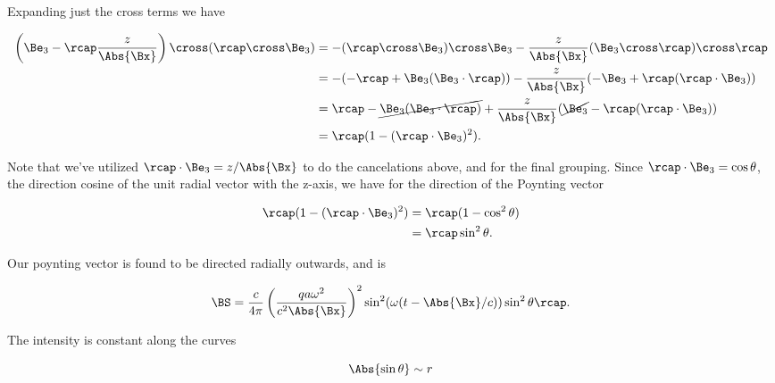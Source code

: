 Expanding just the cross terms we have

\begin{align*}
\left( \Be_3 - \rcap \frac{z}{\Abs{\Bx}} \right) \cross (\rcap \cross \Be_3)
&=
-(\rcap \cross \Be_3) \cross \Be_3 - \frac{z}{\Abs{\Bx}} (\Be_3 \cross \rcap) \cross \rcap \\
&=
-(-\rcap + \Be_3(\Be_3 \cdot \rcap) ) - \frac{z}{\Abs{\Bx}} (-\Be_3 + \rcap (\rcap \cdot \Be_3)) \\
&=
\rcap - \cancel{\Be_3(\Be_3 \cdot \rcap)} + \frac{z}{\Abs{\Bx}} (\cancel{\Be_3} - \rcap (\rcap \cdot \Be_3)) \\
&=
\rcap( 1 - (\rcap \cdot \Be_3)^2 ).
\end{align*}

Note that we've utilized $\rcap \cdot \Be_3 = z/\Abs{\Bx}$ to do the cancelations above, and for the final grouping.  Since $\rcap \cdot \Be_3 = \cos\theta$, the direction cosine of the unit radial vector with the z-axis, we have for the direction of the Poynting vector

\begin{align*}
\rcap( 1 - (\rcap \cdot \Be_3)^2 ) 
&= \rcap (1 - \cos^2\theta) \\
&= \rcap \sin^2\theta.
\end{align*}

Our poynting vector is found to be directed radially outwards, and is

\begin{equation}\label{eqn:relativisticElectrodynamicsL21:n}
\BS =
\frac{c}{4 \pi}
\left( \frac{q a \omega^2}{c^2 \Abs{\Bx} } \right)^2
\sin^2(\omega (t - \Abs{\Bx}/c)) \sin^2\theta \rcap.
\end{equation}

The intensity is constant along the curves

\begin{equation}\label{eqn:relativisticElectrodynamicsL21:n}
\Abs{\sin\theta} \sim r
\end{equation}



\EndArticle
